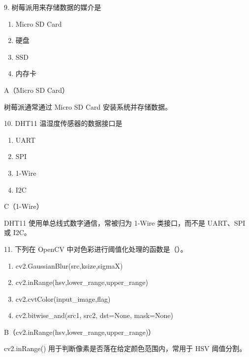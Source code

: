 \begin{question}{9. 树莓派用来存储数据的媒介是}
\begin{enumerate}[label=\Alph*., leftmargin=2.4em, itemsep=0.2em]
\item Micro SD Card
\item 硬盘
\item SSD
\item 内存卡
\end{enumerate}
\end{question}
\begin{answer}
A（Micro SD Card）
\end{answer}
\begin{explanation}
树莓派通常通过 Micro SD Card 安装系统并存储数据。
\end{explanation}

\begin{question}{10. DHT11 温湿度传感器的数据接口是}
\begin{enumerate}[label=\Alph*., leftmargin=2.4em, itemsep=0.2em]
\item UART
\item SPI
\item 1-Wire
\item I2C
\end{enumerate}
\end{question}
\begin{answer}
C（1-Wire）
\end{answer}
\begin{explanation}
DHT11 使用单总线式数字通信，常被归为 1-Wire 类接口，而不是 UART、SPI 或 I2C。
\end{explanation}

\begin{question}{11. 下列在 OpenCV 中对色彩进行阈值化处理的函数是（）。}
\begin{enumerate}[label=\Alph*., leftmargin=2.4em, itemsep=0.2em]
\item cv2.GaussianBlur(src,ksize,sigmaX)
\item cv2.inRange(hsv,lower\_range,upper\_range)
\item cv2.cvtColor(input\_image,flag)
\item cv2.bitwise\_and(src1, src2, dst=None, mask=None)
\end{enumerate}
\end{question}
\begin{answer}
B（cv2.inRange(hsv,lower\_range,upper\_range)）
\end{answer}
\begin{explanation}
cv2.inRange() 用于判断像素是否落在给定颜色范围内，常用于 HSV 阈值分割。
\end{explanation}

